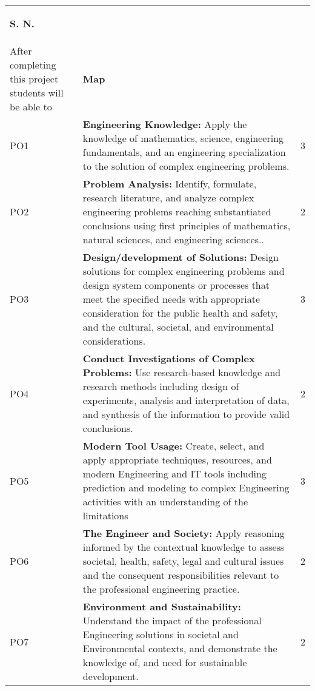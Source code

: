 \section*{}
	\begin{tabular}{|p{1cm}|p{12cm}|p{2cm}|}
			\hline
			\begin{center}
				\textbf{S. N.}
			\end{center} &\begin{center}
				 \textbf{Program outcomes }\\ \vspace*{1mm} After completing this project students will be able to
			\end{center} & \begin{center}
				\textbf{Map}
			\end{center} \\ 
			\hline
			PO1 & 
   \textbf{Engineering Knowledge:} Apply the knowledge of mathematics, science,
engineering fundamentals, and an engineering specialization to the solution of complex engineering problems.& 3 \\ \hline
			PO2 & \textbf{Problem Analysis: }Identify, formulate, research literature, and analyze complex engineering problems reaching substantiated conclusions using first principles of mathematics, natural sciences, and engineering sciences.. &  2\\ \hline
			PO3 &
   \textbf{Design/development of Solutions:} Design solutions for complex engineering problems and design system components or processes that meet the specified needs with appropriate consideration for the public health and safety, and the cultural, societal, and environmental considerations.  & 3\\  \hline
			PO4 &\textbf{Conduct Investigations of Complex Problems:}  Use research-based knowledge and research methods including design of experiments, analysis and interpretation of data, and synthesis of the information to provide valid conclusions.
 & 2\\  \hline
			PO5 & \textbf{Modern Tool Usage:}  Create, select, and apply appropriate techniques,
resources, and modern Engineering and IT tools including prediction and modeling to complex Engineering activities with an understanding of the
limitations
  & 3\\  \hline
			PO6 &\textbf{The Engineer and Society:}   Apply reasoning informed by the contextual
knowledge to assess societal, health, safety, legal and cultural issues and 
the
consequent responsibilities relevant to the professional engineering practice.
 & 2\\  \hline
			PO7 & \textbf{Environment and Sustainability:} Understand the impact of the professional Engineering solutions in societal and Environmental 
contexts, and demonstrate the knowledge of, and need for sustainable
development. & 2\\  \hline
		\end{tabular}
\\ 



